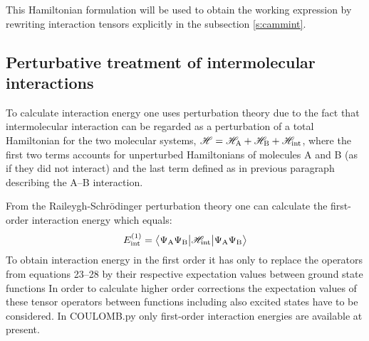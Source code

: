 \documentclass[a4paper,titlepage,twoside,fleqn]{article}
\newcommand{\braket}[2]{\ensuremath{\bigl\langle {#1} \bigl\lvert {#2} \bigr\rangle}}
\newcommand{\tbraket}[3]{\ensuremath{\bigl\langle {#1} \bigl\lvert {#2} \bigl\lvert {#3} \bigr\rangle}}
\begin{document}
This Hamiltonian formulation will be used to obtain 
the working expression by rewriting interaction tensors 
explicitly in the subsection \ref{s:cammint}.



\subsection*{Perturbative treatment of intermolecular interactions}
To calculate interaction energy one uses perturbation theory 
due to the fact that intermolecular interaction can be
regarded as a perturbation of a total Hamiltonian for 
the two molecular systems, $\mathscr{H}=\mathscr{H}_{\rm A}+\mathscr{H}_{\rm B}+\mathscr{H}_{\rm int}$, 
where the first two terms accounts for unperturbed Hamiltonians
of molecules A and B (as if they did not interact) and
the last term defined as in previous paragraph describing
the A--B interaction. 

From the Raileygh-Schr{\"o}dinger perturbation theory one can
calculate the first-order interaction energy which equals:
\begin{equation}
E^{(1)}_{\rm int} = \tbraket{\Psi_{\rm A}\Psi_{\rm B}}
                            {\mathscr{H}_{\rm int}}
                            {\Psi_{\rm A}\Psi_{\rm B}}
\end{equation}
To obtain interaction energy in the first order it has only
to replace the operators from equations 23--28 by
their respective expectation values between ground state 
functions 
In order to calculate higher order corrections the expectation
values of these tensor operators between functions including 
also excited states have to be considered. In {\sc COULOMB.py}
only first-order interaction energies are available at present.
\end{document}
